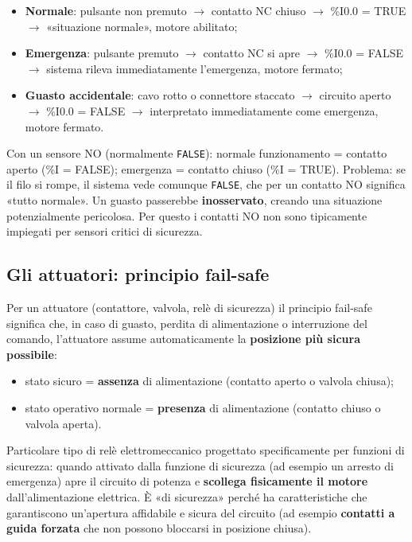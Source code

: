 \begin{ex}
\begin{itemize}
    \item \textbf{Normale}: pulsante non premuto $\to$ contatto NC chiuso $\to$ \%I0.0 = TRUE $\to$ «situazione normale», motore abilitato;
    \item \textbf{Emergenza}: pulsante premuto $\to$ contatto NC si apre $\to$ \%I0.0 = FALSE $\to$ sistema rileva immediatamente l'emergenza, motore fermato;
    \item \textbf{Guasto accidentale}: cavo rotto o connettore staccato $\to$ circuito aperto $\to$ \%I0.0 = FALSE $\to$ interpretato immediatamente come emergenza, motore fermato.
\end{itemize}
\end{ex}

\begin{note}
Con un sensore NO (normalmente \texttt{FALSE}): normale funzionamento = contatto aperto (\%I = FALSE); emergenza = contatto chiuso (\%I = TRUE). Problema: se il filo si rompe, il sistema vede comunque \texttt{FALSE}, che per un contatto NO significa «tutto normale». Un guasto passerebbe \textbf{inosservato}, creando una situazione potenzialmente pericolosa. Per questo i contatti NO non sono tipicamente impiegati per sensori critici di sicurezza.
\end{note}

\subsection{Gli attuatori: principio fail-safe}
Per un attuatore (contattore, valvola, relè di sicurezza) il principio fail-safe significa che, in caso di guasto, perdita di alimentazione o interruzione del comando, l'attuatore assume automaticamente la \textbf{posizione più sicura possibile}:
\begin{itemize}
    \item stato sicuro = \textbf{assenza} di alimentazione (contatto aperto o valvola chiusa);
    \item stato operativo normale = \textbf{presenza} di alimentazione (contatto chiuso o valvola aperta).
\end{itemize}

\begin{defn}
Particolare tipo di relè elettromeccanico progettato specificamente per funzioni di sicurezza: quando attivato dalla funzione di sicurezza (ad esempio un arresto di emergenza) apre il circuito di potenza e \textbf{scollega fisicamente il motore} dall'alimentazione elettrica. È «di sicurezza» perché ha caratteristiche che garantiscono un'apertura affidabile e sicura del circuito (ad esempio \textbf{contatti a guida forzata} che non possono bloccarsi in posizione chiusa).
\end{defn}

